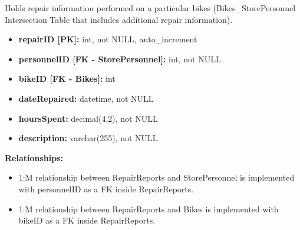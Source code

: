 \documentclass{article}
\begin{document}
\begin{tcolorbox}[colback=secondarycolor, colframe=primarycolor, title=\textbf{RepairReports Table}]
Holds repair information performed on a particular bikes (Bikes\_StorePersonnel Intersection Table that includes additional repair information).
\vspace{0.2cm}

\begin{itemize}
  \item \textbf{repairID [PK]:} int, not NULL, auto\_increment
  \item \textbf{personnelID [FK - StorePersonnel]:} int, not NULL
  \item \textbf{bikeID [FK - Bikes]:} int
  \item \textbf{dateRepaired:} datetime, not NULL
  \item \textbf{hoursSpent:} decimal(4,2), not NULL
  \item \textbf{description:} varchar(255), not NULL
\end{itemize}
\vspace{0.2cm}

\textbf{Relationships:}
\vspace{0.2cm}
\begin{itemize}
  \item 1:M relationship between RepairReports and StorePersonnel is implemented with personnelID as a FK inside RepairReports.
  \item 1:M relationship between RepairReports and Bikes is implemented with bikeID as a FK inside RepairReports.
\end{itemize}
\end{tcolorbox}

\vspace{0.5cm}
\end{document}
